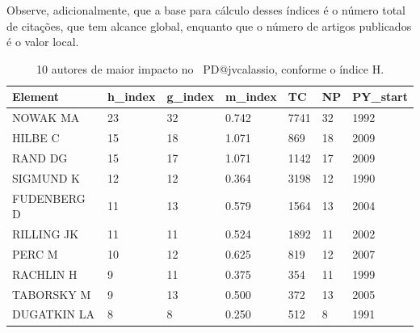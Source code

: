 Observe, adicionalmente, que a base para cálculo desses índices é o número total de citações, que tem alcance global, enquanto que o número de artigos publicados é o valor local.

\begin{table}[htp]
    \centering
    \footnotesize
    \begin{tabular}{|l|l|l|l|l|l|l|}
    \hline
        Element & h\_index & g\_index & m\_index & TC & NP & PY\_start \\ \hline
        NOWAK MA & 23 & 32 & 0.742 & 7741 & 32 & 1992 \\ \hline
        HILBE C & 15 & 18 & 1.071 & 869 & 18 & 2009 \\ \hline
        RAND DG & 15 & 17 & 1.071 & 1142 & 17 & 2009 \\ \hline
        SIGMUND K & 12 & 12 & 0.364 & 3198 & 12 & 1990 \\ \hline
        FUDENBERG D & 11 & 13 & 0.579 & 1564 & 13 & 2004 \\ \hline
        RILLING JK & 11 & 11 & 0.524 & 1892 & 11 & 2002 \\ \hline
        PERC M & 10 & 12 & 0.625 & 819 & 12 & 2007 \\ \hline
        RACHLIN H & 9 & 11 & 0.375 & 354 & 11 & 1999 \\ \hline
        TABORSKY M & 9 & 13 & 0.500 & 372 & 13 & 2005 \\ \hline
        DUGATKIN LA & 8 & 8 & 0.250 & 512 & 8 & 1991 \\ \hline
    \end{tabular}
    \caption{10 autores de maior impacto no \dataset\ PD@jvcalassio, conforme o índice H.}
    \label{tab:PD@jvcalassio:Author:ImpactoH}
\end{table}

